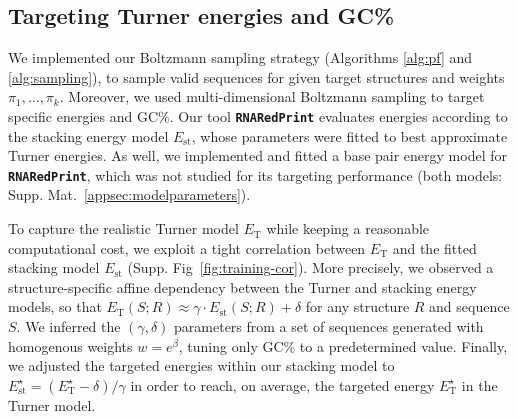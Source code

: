 \documentclass{bmcart}
\newcommand{\Nuc}[1]{{\sf #1}}
\newcommand{\Cb}{\Nuc{C}}
\newcommand{\Gb}{\Nuc{G}}
\newcommand{\GCb}{\Gb\Cb}
\newcommand{\ourprog}{{\tt \bfseries{}\color{black!85}RNA\textcolor{red!70!black}{Red}Print}}
\newcommand{\EnergyTurner}{E_{\text{T}}}
\newcommand{\EnergyStacking}{E_{\text{st}}}
\begin{document}
\subsection*{Targeting Turner energies and \GCb\%}
We implemented our Boltzmann sampling strategy (Algorithms
\ref{alg:pf} and \ref{alg:sampling}), to sample valid sequences for
given target structures and weights $\pi_1,\dots,\pi_k$.  Moreover, we
used multi-dimensional Boltzmann sampling to target specific energies and
\GCb\%.  Our tool \ourprog{} evaluates energies according to the
stacking energy model $\EnergyStacking$, whose parameters were fitted
to best approximate Turner energies. As well, we implemented and
fitted a base pair energy model for \ourprog{}, which was not studied
for its targeting performance (both models:
Supp. Mat.~\ref{appsec:modelparameters}).
%
%

To capture the realistic Turner model $\EnergyTurner$ while keeping
a reasonable computational cost, we exploit a tight correlation between
$\EnergyTurner$ and the fitted stacking model $\EnergyStacking$
(Supp. Fig~\ref{fig:training-cor}). More precisely, we observed a
structure-specific affine dependency between the Turner and stacking
energy models, so that
$\EnergyTurner(S;R) \approx \gamma\cdot \EnergyStacking(S;R) + \delta$
for any structure $R$ and sequence $S$. We inferred the
$(\gamma,\delta)$ parameters from a set of sequences generated with
homogenous weights $w=e^{\beta}$, tuning only \GCb\% to a
predetermined value.  Finally, we adjusted the targeted energies
within our stacking model to
$\EnergyStacking^{\star} = (\EnergyTurner^{\star}- \delta)/\gamma$ in
order to reach, on average, the targeted energy
$\EnergyTurner^{\star}$ in the Turner model.
\end{document}
